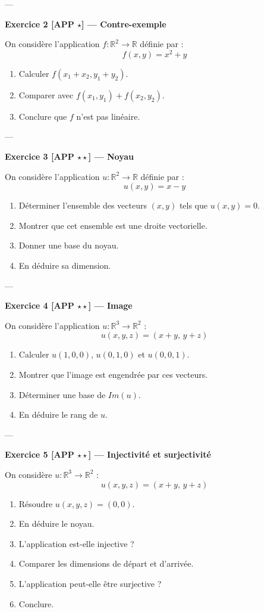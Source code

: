\documentclass[11pt,a4paper]{article}
\begin{document}
---

\textbf{Exercice 2 [APP $\star$] — Contre-exemple}

On considère l'application $f : \mathbb{R}^2 \to \mathbb{R}$ définie par :
\[
f(x,y) = x^2 + y
\]

\begin{enumerate}
\item Calculer $f(x_1+x_2, y_1+y_2)$.
\item Comparer avec $f(x_1,y_1) + f(x_2,y_2)$.
\item Conclure que $f$ n'est pas linéaire.
\end{enumerate}

---

\textbf{Exercice 3 [APP $\star\star$] — Noyau}

On considère l'application $u : \mathbb{R}^2 \to \mathbb{R}$ définie par :
\[
u(x,y) = x - y
\]

\begin{enumerate}
\item Déterminer l'ensemble des vecteurs $(x,y)$ tels que $u(x,y)=0$.
\item Montrer que cet ensemble est une droite vectorielle.
\item Donner une base du noyau.
\item En déduire sa dimension.
\end{enumerate}

---

\textbf{Exercice 4 [APP $\star\star$] — Image}

On considère l'application $u : \mathbb{R}^3 \to \mathbb{R}^2$ :
\[
u(x,y,z) = (x+y,\, y+z)
\]

\begin{enumerate}
\item Calculer $u(1,0,0)$, $u(0,1,0)$ et $u(0,0,1)$.
\item Montrer que l'image est engendrée par ces vecteurs.
\item Déterminer une base de $Im(u)$.
\item En déduire le rang de $u$.
\end{enumerate}

---

\textbf{Exercice 5 [APP $\star\star$] — Injectivité et surjectivité}

On considère $u : \mathbb{R}^3 \to \mathbb{R}^2$ :
\[
u(x,y,z) = (x+y,\, y+z)
\]

\begin{enumerate}
\item Résoudre $u(x,y,z)=(0,0)$.
\item En déduire le noyau.
\item L'application est-elle injective ?
\item Comparer les dimensions de départ et d'arrivée.
\item L'application peut-elle être surjective ?
\item Conclure.
\end{enumerate}
\end{document}
